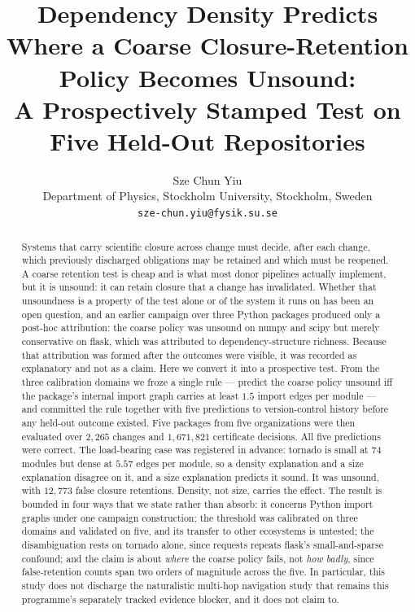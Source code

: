 \documentclass[11pt]{article}
\title{Dependency Density Predicts Where a Coarse Closure-Retention Policy Becomes Unsound:\\A Prospectively Stamped Test on Five Held-Out Repositories}
\author{Sze Chun Yiu\\Department of Physics, Stockholm University, Stockholm, Sweden\\\texttt{sze-chun.yiu@fysik.su.se}}
\date{}
\begin{document}
\maketitle

\begin{abstract}
Systems that carry scientific closure across change must decide, after each change, which previously discharged obligations may be retained and which must be reopened. A coarse retention test is cheap and is what most donor pipelines actually implement, but it is unsound: it can retain closure that a change has invalidated. Whether that unsoundness is a property of the test alone or of the system it runs on has been an open question, and an earlier campaign over three Python packages produced only a post-hoc attribution: the coarse policy was unsound on numpy and scipy but merely conservative on flask, which was attributed to dependency-structure richness. Because that attribution was formed after the outcomes were visible, it was recorded as explanatory and not as a claim. Here we convert it into a prospective test. From the three calibration domains we froze a single rule --- predict the coarse policy unsound iff the package's internal import graph carries at least $1.5$ import edges per module --- and committed the rule together with five predictions to version-control history before any held-out outcome existed. Five packages from five organizations were then evaluated over $2{,}265$ changes and $1{,}671{,}821$ certificate decisions. All five predictions were correct. The load-bearing case was registered in advance: tornado is small at $74$ modules but dense at $5.57$ edges per module, so a density explanation and a size explanation disagree on it, and a size explanation predicts it sound. It was unsound, with $12{,}773$ false closure retentions. Density, not size, carries the effect. The result is bounded in four ways that we state rather than absorb: it concerns Python import graphs under one campaign construction; the threshold was calibrated on three domains and validated on five, and its transfer to other ecosystems is untested; the disambiguation rests on tornado alone, since requests repeats flask's small-and-sparse confound; and the claim is about \emph{where} the coarse policy fails, not \emph{how badly}, since false-retention counts span two orders of magnitude across the five. In particular, this study does not discharge the naturalistic multi-hop navigation study that remains this programme's separately tracked evidence blocker, and it does not claim to.
\end{abstract}
\end{document}
